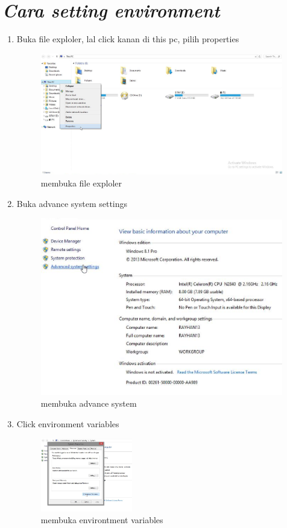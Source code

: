 \section*{\textit{ Cara setting environment }}

\begin{enumerate}

\item Buka file exploler, lal click kanan di this pc, pilih properties
\begin{figure}[h]
\centering
\includegraphics[scale=0.8]{figure/setting1.png}
\caption{membuka file exploler}
\end{figure}

\item Buka advance system settings
\begin{figure}[hb]
\centering
\includegraphics[scale=0.8]{figure/setting2.png}
\caption{membuka advance system}
\end{figure}

\item Click environment variables
\begin{figure}[hb]
\includegraphics[width=4cm]{figure/setting3.png}
\centering
\caption{membuka environtment variables}
\end{figure}


\end{enumerate}

